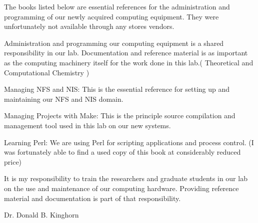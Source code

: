 \documentclass{letter}
\begin{document}
\begin{letter}{}


The books listed below are essential references for the administration and programming of our newly acquired computing equipment. 
They were unfortunately not available through any stores vendors.

Administration and programming our computing equipment is a shared responsibility in our lab. Documentation and reference material is as important as the computing machinery itself for the work done in this lab.( Theoretical and Computational Chemistry )

Managing NFS and NIS: This is the essential reference for setting up and maintaining our NFS and NIS domain.

Managing Projects with Make: This is the principle source compilation and management tool used in this lab on our new systems.

Learning Perl: We are using Perl for scripting applications and process control. (I was fortunately able to find a used copy of this book at considerably reduced price)

It is my responsibility to train the researchers and graduate students in our lab on the use and maintenance of our computing hardware. Providing reference material and documentation is part of that responsibility. 

Dr. Donald B. Kinghorn



\end{letter}
\end{document}
